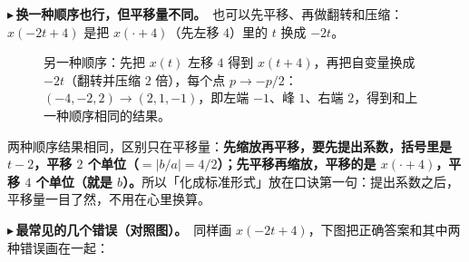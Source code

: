 \documentclass[UTF8,a4paper,11pt]{ctexart}
\newcommand{\trirow}[7]{%
  \draw[gray!50] (-8,#1) -- (8.5,#1);
  \draw[very thick,#5] (#2,#1) -- (#3,{#1+0.9}) -- (#4,#1);
  \draw[dotted,gray] (#3,#1) -- (#3,{#1+0.9});
  \foreach \k in {#7} { \draw (\k,{#1+0.04}) -- (\k,{#1-0.04}) node[below,font=\tiny] {$\k$}; }
  \node[anchor=west,font=\scriptsize,#5] at (8.6,{#1+0.4}) {#6};
}
\newcounter{ex}[section]
\newcommand{\point}[1]{\par\addvspace{1ex}\noindent\textcolor{ptteal}{$\blacktriangleright$\,\textbf{#1}}\ }
\renewcommand{\paragraph}[1]{\point{#1}}
\begin{document}
\paragraph{换一种顺序也行，但平移量不同。}也可以先平移、再做翻转和压缩：$x(-2t+4)$ 是把 $x(\cdot+4)$（先左移 $4$）里的 $t$ 换成 $-2t$。

\begin{figure}[H]
\centering
{}
\caption{另一种顺序：先把 $x(t)$ 左移 $4$ 得到 $x(t+4)$，再把自变量换成 $-2t$（翻转并压缩 $2$ 倍），每个点 $p\to-p/2$：$(-4,-2,2)\to(2,1,-1)$，即左端 $-1$、峰 $1$、右端 $2$，得到和上一种顺序相同的结果。}
\end{figure}
两种顺序结果相同，区别只在平移量：\textbf{先缩放再平移，要先提出系数，括号里是 $t-2$，平移 $2$ 个单位（$=|b/a|=4/2$）；先平移再缩放，平移的是 $x(\cdot+4)$，平移 $4$ 个单位（就是 $b$）。}所以「化成标准形式」放在口诀第一句：提出系数之后，平移量一目了然，不用在心里换算。

\paragraph{最常见的几个错误（对照图）。}同样画 $x(-2t+4)$，下图把正确答案和其中两种错误画在一起：
\end{document}
